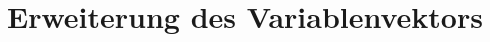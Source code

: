 \documentclass[a4paper,12pt,fleqn]{book}
\begin{document}
\section[modC]{Erweiterung des Variablenvektors}



%
%
\end{document}
